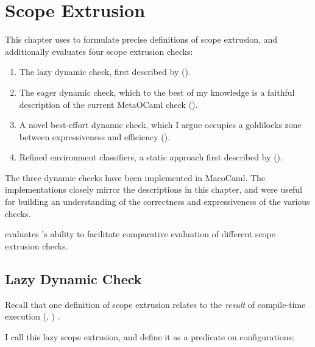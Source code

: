\chapter{Scope Extrusion}\label{chapter:scope-extrusion}
This chapter uses \calculusName{} to formulate precise definitions of scope extrusion, and additionally evaluates four scope extrusion checks: 
\begin{enumerate}
  \item The lazy dynamic check, first described by \citet{kiselyov-14} ().
  \item The eager dynamic check, which to the best of my knowledge is a faithful description of the current MetaOCaml check ().
  \item A novel best-effort dynamic check, which I argue occupies a goldilocks zone between expressiveness and efficiency ().
  \item Refined environment classifiers, a static approach first described by \citet{kiselyov-16} ().
\end{enumerate}
The three dynamic checks have been implemented in MacoCaml. The implementations closely mirror the descriptions in this chapter, and were useful for building an understanding of the correctness and expressiveness of the various checks. 

 evaluates \calculusName{}'s ability to facilitate comparative evaluation of different scope extrusion checks.

\section{Lazy Dynamic Check}\label{section:lazy-dynamic-check-formal}
Recall that one definition of scope extrusion relates to the \textit{result} of compile-time execution (, ) \citep{kiselyov-14}. 



I call this lazy scope extrusion, and define it as a predicate on \coreLang{} configurations: 

